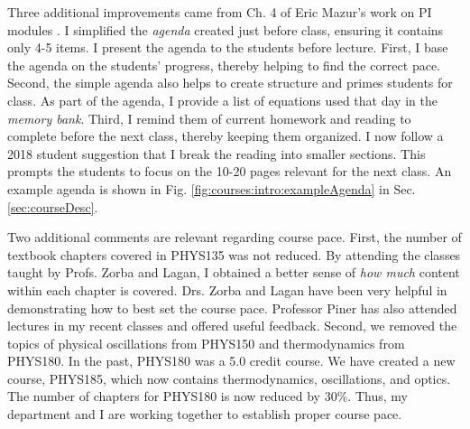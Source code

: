\documentclass[../../main.tex]{subfiles}
\begin{document}
Three additional improvements came from Ch. 4 of Eric Mazur's work on PI modules \cite{mazur}.  I simplified the \textit{agenda} created just before class, ensuring it contains only 4-5 items.  I present the agenda to the students before lecture.  First, I base the agenda on the students' progress, thereby helping to find the correct pace.  Second, the simple agenda also helps to create structure and primes students for class.  As part of the agenda, I provide a list of equations used that day in the \textit{memory bank}.  Third, I remind them of current homework and reading to complete before the next class, thereby keeping them organized.  I now follow a 2018 student suggestion that I break the reading into smaller sections.  This prompts the students to focus on the 10-20 pages relevant for the next class.  An example agenda is shown in Fig. \ref{fig:courses:intro:exampleAgenda} in Sec. \ref{sec:courseDesc}. \\ \hspace{0.1cm}

Two additional comments are relevant regarding course pace.  First, the number of textbook chapters covered in PHYS135 was not reduced.  By attending the classes taught by Profs. Zorba and Lagan, I obtained a better sense of \textit{how much} content within each chapter is covered.  Drs. Zorba and Lagan have been very helpful in demonstrating how to best set the course pace.  Professor Piner has also attended lectures in my recent classes and offered useful feedback.  Second, we removed the topics of physical oscillations from PHYS150 and thermodynamics from PHYS180.  In the past, PHYS180 was a 5.0 credit course.  We have created a new course, PHYS185, which now contains thermodynamics, oscillations, and optics.  The number of chapters for PHYS180 is now reduced by 30\%.  Thus, my department and I are working together to establish proper course pace.  \\ \hspace{0.1cm}
\end{document}
